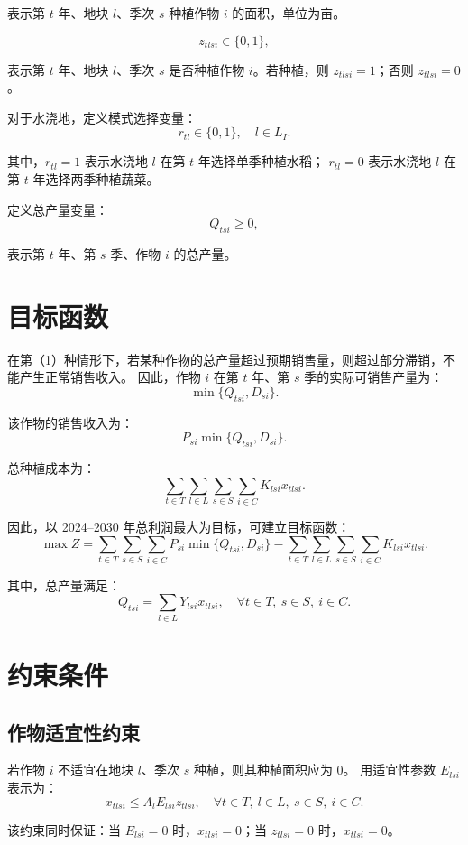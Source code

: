 \documentclass[12pt,a4paper]{ctexart}
\begin{document}
表示第 $t$ 年、地块 $l$、季次 $s$ 种植作物 $i$ 的面积，单位为亩。

\[
z_{tlsi}\in\{0,1\},
\]

表示第 $t$ 年、地块 $l$、季次 $s$ 是否种植作物 $i$。若种植，则 $z_{tlsi}=1$；否则 $z_{tlsi}=0$。

对于水浇地，定义模式选择变量：
\[
r_{tl}\in\{0,1\},\quad l\in L_I.
\]

其中，$r_{tl}=1$ 表示水浇地 $l$ 在第 $t$ 年选择单季种植水稻；
$r_{tl}=0$ 表示水浇地 $l$ 在第 $t$ 年选择两季种植蔬菜。

定义总产量变量：
\[
Q_{tsi}\geq 0,
\]

表示第 $t$ 年、第 $s$ 季、作物 $i$ 的总产量。

\section{目标函数}

在第（1）种情形下，若某种作物的总产量超过预期销售量，则超过部分滞销，不能产生正常销售收入。
因此，作物 $i$ 在第 $t$ 年、第 $s$ 季的实际可销售产量为：
\[
\min\{Q_{tsi},D_{si}\}.
\]

该作物的销售收入为：
\[
P_{si}\min\{Q_{tsi},D_{si}\}.
\]

总种植成本为：
\[
\sum_{t\in T}\sum_{l\in L}\sum_{s\in S}\sum_{i\in C}
K_{lsi}x_{tlsi}.
\]

因此，以 2024--2030 年总利润最大为目标，可建立目标函数：
\[
\max Z=
\sum_{t\in T}\sum_{s\in S}\sum_{i\in C}
P_{si}\min\{Q_{tsi},D_{si}\}
-
\sum_{t\in T}\sum_{l\in L}\sum_{s\in S}\sum_{i\in C}
K_{lsi}x_{tlsi}.
\]

其中，总产量满足：
\[
Q_{tsi}=\sum_{l\in L}Y_{lsi}x_{tlsi},
\quad \forall t\in T,\ s\in S,\ i\in C.
\]

\section{约束条件}

\subsection{作物适宜性约束}

若作物 $i$ 不适宜在地块 $l$、季次 $s$ 种植，则其种植面积应为 0。
用适宜性参数 $E_{lsi}$ 表示为：
\[
x_{tlsi}\leq A_lE_{lsi}z_{tlsi},
\quad \forall t\in T,\ l\in L,\ s\in S,\ i\in C.
\]

该约束同时保证：当 $E_{lsi}=0$ 时，$x_{tlsi}=0$；当 $z_{tlsi}=0$ 时，$x_{tlsi}=0$。
\end{document}
